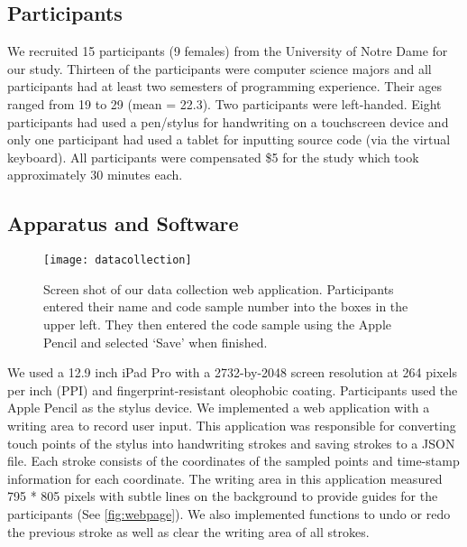 \documentclass{vgtc}                          %
\begin{document}




\subsection{Participants}
We recruited 15 participants (9 females) from the University of Notre Dame for our study. Thirteen of the participants were computer science majors and all participants had at least two semesters of programming experience. Their ages ranged from 19 to 29 (mean = 22.3). Two participants were left-handed. Eight participants had used a pen/stylus for handwriting on a touchscreen device and only one participant had used a tablet for inputting source code (via the virtual keyboard). All participants were compensated \$5 for the study which took approximately 30 minutes each.

\subsection{Apparatus and Software}

\begin{figure}[tb]
 \centering %
 \texttt{[image: datacollection]}
 \caption{Screen shot of our data collection web application.  Participants entered their name and code sample number into the boxes in the upper left.  They then entered the code sample using the Apple Pencil and selected `Save' when finished.}
 \label{fig:webpage}
\end{figure}


We used a 12.9 inch iPad Pro with a 2732-by-2048 screen resolution at 264 pixels per inch (PPI) and fingerprint-resistant oleophobic coating. Participants used the Apple Pencil as the stylus device. We implemented a web application with a writing area to record user input. This application was responsible for converting touch points of the stylus into handwriting strokes and saving strokes to a JSON file. Each stroke consists of the coordinates of the sampled points and time-stamp information for each coordinate. The writing area in this application measured 795 * 805 pixels with subtle lines on the background to provide guides for the participants (See \autoref{fig:webpage}). We also implemented functions to undo or redo the previous stroke as well as clear the writing area of all strokes. 
\end{document}
